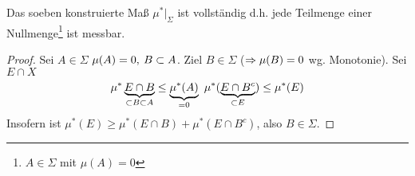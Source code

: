 \documentclass[skript.tex]{subfiles}
\begin{document}
	\begin{bem}
		Das soeben konstruierte Maß $\mu^*|_\Sigma$ ist vollständig d.h. jede Teilmenge einer Nullmenge\footnote{$A\in\Sigma$ mit $ \mu(A)=0$} ist messbar.
	\end{bem}

	\begin{proof}
		Sei $A\in\Sigma$ $\mu(A)=0, \: B\subset A$. Ziel $B\in\Sigma$ ($\Rightarrow \mu(B)=0$ wg. Monotonie). Sei $E\cap X$
		\begin{equation*}
			\mu^*\underbrace{E\cap B}_{\subset B\subset A}\leq\underbrace{\mu^*(A)}_{=0}\ \mu^*(\underbrace{E\cap B^c}_{\subset E})\leq\mu^*(E)
		\end{equation*}
		Insofern ist $\mu^*(E)\geq\mu^*(E\cap B)+\mu^*(E\cap B^c)$, also $B\in\Sigma$.
	\end{proof}
\end{document}
